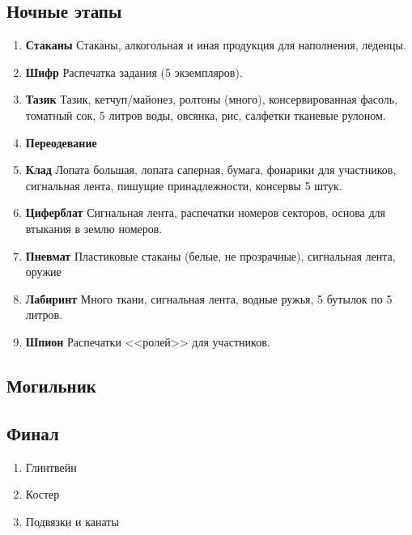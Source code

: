 \subsection*{Ночные этапы}
	\begin{enumerate}
	\item \textbf{Стаканы} Стаканы, алкогольная и иная продукция для наполнения, леденцы.
	\item \textbf{Шифр} Распечатка задания (5 экземпляров).
	\item \textbf{Тазик} Тазик, кетчуп/майонез, ролтоны (много), консервированная фасоль, томатный сок, 5 литров воды, овсянка, рис, салфетки тканевые рулоном.
	\item \textbf{Переодевание}
	\item \textbf{Клад} Лопата большая, лопата саперная, бумага, фонарики для участников, сигнальная лента, пишущие принадлежности, консервы 5 штук.
	\item \textbf{Циферблат} Сигнальная лента, распечатки номеров секторов, основа для втыкания в землю номеров.
	\item \textbf{Пневмат} Пластиковые стаканы (белые, не прозрачные), сигнальная лента, оружие
	\item \textbf{Лабиринт} Много ткани, сигнальная лента, водные ружья, 5 бутылок по 5 литров.
	\item \textbf{Шпион} Распечатки <<ролей>> для участников.
	\end{enumerate}
	
\subsection*{Могильник}

\subsection*{Финал}
	\begin{enumerate}
	\item Глинтвейн
	\item Костер
	\item Подвязки и канаты
	\end{enumerate}